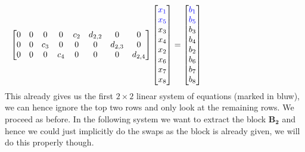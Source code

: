 \documentclass{article}
\begin{document}
\begin{align*}
\begin{bmatrix}
        0 & 0 & 0 & 0& c_{2} & d_{2,2} & 0 & 0 \\
        0 & 0& c_{3} & 0 & 0 & 0 & d_{2,3} & 0 \\
        0 & 0 & 0 &c_{4} & 0 & 0 & 0 & d_{2,4}
    \end{bmatrix}\begin{bmatrix}
        \color{blue}x_{1}\color{black} \\ \color{blue}x_{5}\color{black} \\ x_{3} \\ x_{4} \\ x_{2} \\ x_{6} \\ x_{7} \\ x_{8}
    \end{bmatrix} = \begin{bmatrix}
        \color{blue}b_{1}\color{black} \\ \color{blue}b_{5}\color{black} \\ b_{3} \\ b_{4} \\ b_{2} \\ b_{6} \\ b_{7} \\ b_{8}
    \end{bmatrix} \quad \phantom{\substack{\text{swap column $2$ with column $5$} \\
                                  \text{swap row $2$ with row $5$}}}                        
\end{align*}
This already gives us the first $2 \times 2$ linear system of equations (marked in bluw), we can hence ignore the top two rows and only look at the remaining rows. We proceed as before. In the following system we want to extract the block $\mathbf{B_{2}}$ and hence we could just implicitly do the swaps as the block is already given, we will do this properly though.
\end{document}
